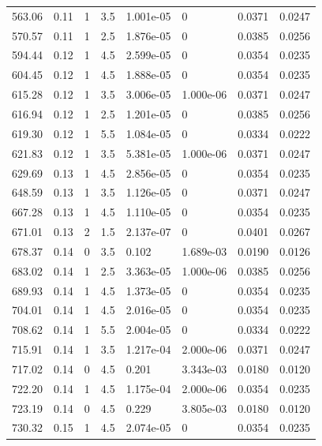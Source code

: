 \documentclass[preview]{standalone}
\begin{document}
{{{\begin{tabular}{L{1.2cm}C{1.2cm} C{0.3cm}C{0.5cm} C{1.4cm}C{1.4cm} C{1.4cm}C{1.4cm}}
  563.06  &  0.11  & 1     & 3.5 &  1.001e-05  & 0  & 0.0371 &  0.0247   \\ 
  570.57  &  0.11  & 1     & 2.5 &  1.876e-05  & 0  & 0.0385 &  0.0256   \\ 
  594.44  &  0.12  & 1     & 4.5 &  2.599e-05  & 0  & 0.0354 &  0.0235   \\ 
  604.45  &  0.12  & 1     & 4.5 &  1.888e-05  & 0  & 0.0354 &  0.0235   \\ 
  615.28  &  0.12  & 1     & 3.5 &  3.006e-05  & 1.000e-06  & 0.0371 &  0.0247   \\ 
  616.94  &  0.12  & 1     & 2.5 &  1.201e-05  & 0  & 0.0385 &  0.0256   \\ 
  619.30  &  0.12  & 1     & 5.5 &  1.084e-05  & 0  & 0.0334 &  0.0222   \\ 
  621.83  &  0.12  & 1     & 3.5 &  5.381e-05  & 1.000e-06  & 0.0371 &  0.0247   \\ 
  629.69  &  0.13  & 1     & 4.5 &  2.856e-05  & 0  & 0.0354 &  0.0235   \\ 
  648.59  &  0.13  & 1     & 3.5 &  1.126e-05  & 0  & 0.0371 &  0.0247   \\ 
  667.28  &  0.13  & 1     & 4.5 &  1.110e-05  & 0  & 0.0354 &  0.0235   \\ 
  671.01  &  0.13  & 2     & 1.5 &  2.137e-07  & 0  & 0.0401 &  0.0267   \\ 
  678.37  &  0.14  & 0     & 3.5 &  0.102  & 1.689e-03  & 0.0190 &  0.0126   \\ 
  683.02  &  0.14  & 1     & 2.5 &  3.363e-05  & 1.000e-06  & 0.0385 &  0.0256   \\ 
  689.93  &  0.14  & 1     & 4.5 &  1.373e-05  & 0  & 0.0354 &  0.0235   \\ 
  704.01  &  0.14  & 1     & 4.5 &  2.016e-05  & 0  & 0.0354 &  0.0235   \\ 
  708.62  &  0.14  & 1     & 5.5 &  2.004e-05  & 0  & 0.0334 &  0.0222   \\ 
  715.91  &  0.14  & 1     & 3.5 &  1.217e-04  & 2.000e-06  & 0.0371 &  0.0247   \\ 
  717.02  &  0.14  & 0     & 4.5 &  0.201  & 3.343e-03  & 0.0180 &  0.0120   \\ 
  722.20  &  0.14  & 1     & 4.5 &  1.175e-04  & 2.000e-06  & 0.0354 &  0.0235   \\ 
  723.19  &  0.14  & 0     & 4.5 &  0.229  & 3.805e-03  & 0.0180 &  0.0120   \\ 
  730.32  &  0.15  & 1     & 4.5 &  2.074e-05  & 0  & 0.0354 &  0.0235   \\ 

\end{tabular}}}}
\end{document}
